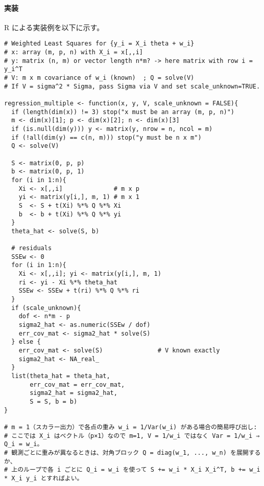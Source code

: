 \paragraph{実装}
R による実装例を以下に示す。
\begin{lstlisting}
# Weighted Least Squares for {y_i = X_i theta + w_i}
# x: array (m, p, n) with X_i = x[,,i]
# y: matrix (n, m) or vector length n*m? -> here matrix with row i = y_i^T
# V: m x m covariance of w_i (known)  ; Q = solve(V)
# If V = sigma^2 * Sigma, pass Sigma via V and set scale_unknown=TRUE.

regression_multiple <- function(x, y, V, scale_unknown = FALSE){
  if (length(dim(x)) != 3) stop("x must be an array (m, p, n)")
  m <- dim(x)[1]; p <- dim(x)[2]; n <- dim(x)[3]
  if (is.null(dim(y))) y <- matrix(y, nrow = n, ncol = m)
  if (!all(dim(y) == c(n, m))) stop("y must be n x m")
  Q <- solve(V)

  S <- matrix(0, p, p)
  b <- matrix(0, p, 1)
  for (i in 1:n){
    Xi <- x[,,i]              # m x p
    yi <- matrix(y[i,], m, 1) # m x 1
    S  <- S + t(Xi) %*% Q %*% Xi
    b  <- b + t(Xi) %*% Q %*% yi
  }
  theta_hat <- solve(S, b)

  # residuals
  SSEw <- 0
  for (i in 1:n){
    Xi <- x[,,i]; yi <- matrix(y[i,], m, 1)
    ri <- yi - Xi %*% theta_hat
    SSEw <- SSEw + t(ri) %*% Q %*% ri
  }
  if (scale_unknown){
    dof <- n*m - p
    sigma2_hat <- as.numeric(SSEw / dof)
    err_cov_mat <- sigma2_hat * solve(S)
  } else {
    err_cov_mat <- solve(S)               # V known exactly
    sigma2_hat <- NA_real_
  }
  list(theta_hat = theta_hat,
       err_cov_mat = err_cov_mat,
       sigma2_hat = sigma2_hat,
       S = S, b = b)
}

# m = 1（スカラー出力）で各点の重み w_i = 1/Var(w_i) がある場合の簡易呼び出し:
# ここでは X_i はベクトル（p×1）なので m=1, V = 1/w_i ではなく Var = 1/w_i ⇒ Q_i = w_i。
# 観測ごとに重みが異なるときは、対角ブロック Q = diag(w_1, ..., w_n) を展開するか、
# 上のループで各 i ごとに Q_i = w_i を使って S += w_i * X_i X_i^T, b += w_i * X_i y_i とすればよい。
\end{lstlisting}

